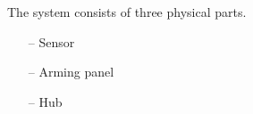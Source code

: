 The system consists of three physical parts.
\begin{itemize}
	\item[--]Sensor
	\item[--]Arming panel
	\item[--]Hub
\end{itemize} 



